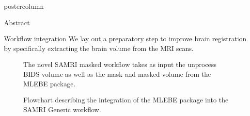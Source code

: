     \begin{frame}
        \vspace{2cm}
        \begin{columns}
            \begin{column}{.42\textwidth}
                \begin{beamercolorbox}[center]{postercolumn}
                    \begin{minipage}{.98\textwidth}  %
                        \parbox[t][\columnheight]{\textwidth}{ %
                            \begin{myblock}{Abstract}
                                
                            \end{myblock}\vfill
                            \vspace{-0.3em}
                            \begin{myblock}{Workflow integration}
                                We lay out a preparatory step to improve brain registration by specifically extracting the brain volume from the MRI scans.
                                \begin{figure}
                                    \centering
                                    \caption{The novel SAMRI masked workflow takes as input the unprocess BIDS volume as well as the mask and masked volume from the \textcolor{lg}{MLEBE} \cite{mlebe} package.}
                                \end{figure}
                                \begin{figure}
                                    \centering
                                    \caption{Flowchart describing the integration of the \textcolor{lg}{MLEBE} \cite{mlebe} package into the \textcolor{lg}{SAMRI} \cite{noauthor_ibt-fmi/samri_2019} Generic workflow.}
                                \end{figure}
                            \end{myblock}\vfill

}
\end{minipage}
\end{beamercolorbox}
\end{column}
\end{columns}
\end{frame}
